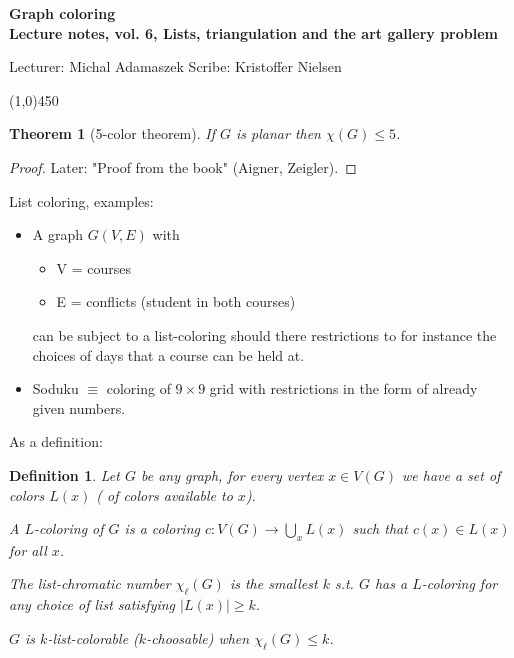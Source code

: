 \documentclass[a4paper]{article}
\theoremstyle{plain}
\newtheorem{theorem}[lemma]{Theorem}
\newtheorem{definition}[lemma]{Definition}
\theoremstyle{myremark}
\newcommand{\LECTURENUMBER}{6}
\newcommand{\LECTURETITLE}{Lists, triangulation and the art gallery problem}
\newcommand{\LECTURESCRIBE}{Kristoffer Nielsen}
\begin{document}
\thispagestyle{empty}

\begin{center}
	{\Large\bf Graph coloring}\\
	{\bf Lecture notes, vol. \LECTURENUMBER, \LECTURETITLE}\\
\end{center}
Lecturer: Michal Adamaszek \hfill Scribe: \LECTURESCRIBE
\begin{center}
\line(1,0){450}
\end{center}


\begin{theorem}[5-color theorem]
If $G$ is planar then $\chi(G) \leq 5$.
\end{theorem}
\begin{proof}
Later: "Proof from the book" (Aigner, Zeigler).
\end{proof}

List coloring, examples:
\begin{itemize}
\item[1]A graph $G(V,E)$ with
	\begin{itemize}
	\item V = courses
	\item E = conflicts (student in both courses)
	\end{itemize}
	can be subject to a list-coloring should there restrictions to for instance  the choices of days that a course can be held at. 
\item[2]Soduku $\equiv$ coloring of $9\times 9$ grid with restrictions in the form of already given numbers.
\end{itemize}

As a definition:
\begin{definition}
Let $G$ be any graph, for every vertex $x\in V(G)$ we have a set of colors $L(x)$ ( of colors available to $x$).

A $L$-coloring of $G$ is a coloring $c:V(G)\rightarrow \underset{x}{\bigcup} L(x)$ such that $c(x)\in L(x)$ for all $x$. 

The list-chromatic number $\chi_{\ell}(G)$ is the smallest $k$ s.t. $G$ has a $L$-coloring for any choice of list satisfying $|L(x)|\geq k$. 

$G$ is $k$-list-colorable ($k$-choosable) when $\chi_{\ell}(G)\leq k$.
\end{definition}
\end{document}
